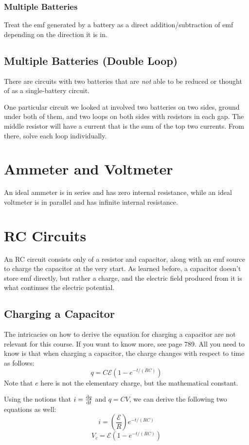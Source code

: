 \documentclass[]{article}
\begin{document}
\subsubsection{Multiple Batteries}
Treat the emf generated by a battery as a direct addition/subtraction of emf depending on the direction it is in.

\subsection{Multiple Batteries (Double Loop)}
There are circuits with two batteries that are \emph{not} able to be reduced or thought of as a single-battery circuit.

One particular circuit we looked at involved two batteries on two sides, ground under both of them, and two loops on both sides with resistors in each gap. The middle resistor will have a current that is the sum of the top two currents. From there, solve each loop individually.

\section{Ammeter and Voltmeter}
An ideal ammeter is in series and has zero internal resistance, while an ideal voltmeter is in parallel and has infinite internal resistance.

\section{RC Circuits}
An RC circuit consists only of a resistor and capacitor, along with an emf source to charge the capacitor at the very start. As learned before, a capacitor doesn't store emf directly, but rather a charge, and the electric field produced from it is what continues the electric potential.

\subsection{Charging a Capacitor}
The intricacies on how to derive the equation for charging a capacitor are not relevant for this course. If you want to know more, see page 789. All you need to know is that when charging a capacitor, the charge changes with respect to time as follows:
\[ q = C \mathcal{E} \left(1 - e^{-t/\left(RC\right)}\right) \]
Note that $ e $ here is not the elementary charge, but the mathematical constant.

Using the notions that $ i = \dv{q}{t} $ and $ q = CV $, we can derive the following two equations as well:
\[ i = \left(\frac{\mathcal{E}}{R}\right) e^{-t/(RC)} \]
\[ V_c = \mathcal{E}\left(1 - e^{-t/(RC)}\right) \]
\end{document}
